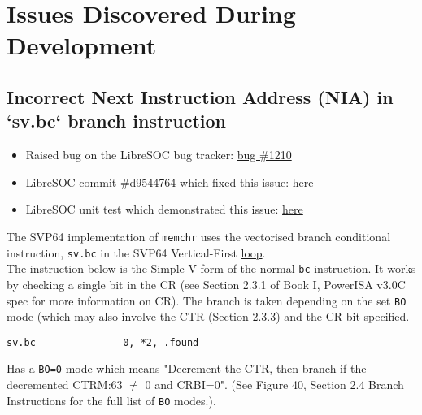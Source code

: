 %
\section{Issues Discovered During Development}

\subsection{Incorrect Next Instruction Address (NIA) in `sv.bc` branch instruction}

\begin{itemize}
  \item Raised bug on the LibreSOC bug tracker:
  \href{https://bugs.libre-soc.org/show_bug.cgi?id=1210}{bug \#1210}
  \item LibreSOC commit \#d9544764 which fixed this issue:
  \href{https://git.libre-soc.org/?p=openpower-isa.git;a=commitdiff;h=d9544764b1710f3807a9c0685d150a665f70b9a2}{here}
  \item LibreSOC unit test which demonstrated this issue:
  \href{https://git.libre-soc.org/?p=openpower-isa.git;a=blob;f=src/openpower/decoder/isa/test_caller_svp64_bc.py;h=93689ded619f8fa67b455f18b122fa60220ddea1;hb=089e6d352ec57be4ab645d18ad9e95df3af0d365#l310}{here}
\end{itemize}

The SVP64 implementation of \texttt{memchr} uses the vectorised branch
conditional instruction, \texttt{sv.bc} in the SVP64 Vertical-First
\href{https://git.vantosh.com/ngisearch/glibc-svp64/src/commit/1afb94889b8ea2f85844e410f87e5a9b8e2e959f/svp64-port/svp64/memchr_svp64.s#L67}{loop}.\\

The instruction below is the Simple-V form of the normal \texttt{bc} instruction.
It works by checking a single bit in the \acrfull{CR}
(see Section 2.3.1 of Book I, PowerISA v3.0C spec for more information
on \acrshort{CR}).
The branch is taken depending on the set \texttt{BO} mode (which may also
involve the \acrfull{CTR} (Section 2.3.3) and the CR bit specified.

\begin{verbatim}
sv.bc               0, *2, .found
\end{verbatim}

Has a \texttt{BO=0} mode which means "Decrement the CTR, then branch
if the decremented CTRM:63 $\neq$ 0 and CRBI=0". (See Figure 40, Section 2.4
Branch Instructions for the full list of \texttt{BO} modes.).\\

